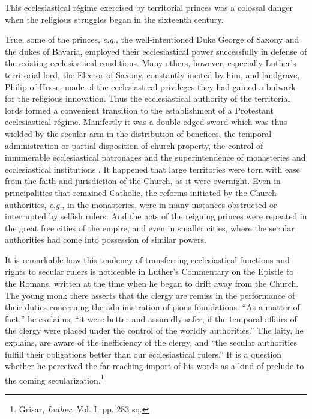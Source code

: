 This ecclesiastical régime exercised by territorial princes was a
colossal danger when the religious struggles began in the sixteenth
century.

True, some of the princes, \textit{e.g.}, the well-intentioned Duke George
of Saxony and the dukes of Bavaria, employed their ecclesiastical
power successfully in defense of the existing ecclesiastical conditions.
Many others, however, especially Luther’s territorial lord, the Elector
of Saxony, constantly incited by him, and landgrave, Philip of Hesse,
made of the ecclesiastical privileges they had gained a bulwark for
the religious innovation. Thus the ecclesiastical authority of the
territorial lords formed a convenient transition to the establishment
of a Protestant ecclesiastical régime. Manifestly it was a double-edged
sword which was thus wielded by the secular arm in the
distribution of benefices, the temporal administration or partial disposition
of church property, the control of innumerable ecclesiastical patronages
and the superintendence of monasteries and ecclesiastical institutions
. It happened that large territories were torn with
ease from the faith and jurisdiction of the Church, as it were overnight.
Even in principalities that remained Catholic, the reforms
initiated by the Church authorities, \textit{e.g.}, in the monasteries, were
in many instances obstructed or interrupted by selfish rulers. And
the acts of the reigning princes were repeated in the great free cities
of the empire, and even in smaller cities, where the secular authorities
had come into possession of similar powers.

It is remarkable how this tendency of transferring ecclesiastical
functions and rights to secular rulers is noticeable in Luther’s Commentary
on the Epistle to the Romans, written at the time when he
began to drift away from the Church. The young monk there asserts
that the clergy are remiss in the performance of their duties concerning
the administration of pious foundations. “As a matter of fact,” he
exclaims, “it were better and assuredly safer, if the temporal affairs of
the clergy were placed under the control of the worldly authorities.”
The laity, he explains, are aware of the inefficiency of the clergy, and
“the secular authorities fulfill their obligations better than our ecclesiastical
rulers.” It is a question whether he perceived the far-reaching
import of his words as a kind of prelude to the coming
secularization.\footnote{Grisar, \textit{Luther}, Vol. I, pp. 283 sq.}

